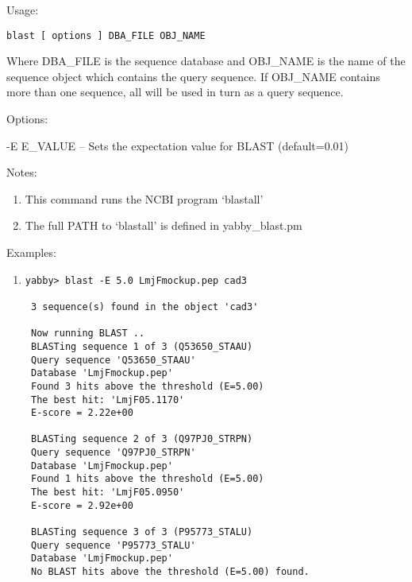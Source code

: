 \begin{description}


\item{Usage:}

{\tt blast [ options ] DBA\_FILE OBJ\_NAME}

 Where DBA\_FILE is the sequence database and OBJ\_NAME is the
 name of the sequence object which contains the query sequence.
 If OBJ\_NAME contains more than one sequence, all will be used
 in turn as a query sequence.


\item{Options:}
\begin{description}
\item -E E\_VALUE -- Sets the expectation value for BLAST (default=0.01)
\end{description}


\item{Notes:}
\begin{enumerate}
\item This command runs the NCBI program `blastall'
\item The full PATH to `blastall' is defined in yabby\_blast.pm
\end{enumerate}


\item{Examples:}
\begin{enumerate}

\item
\begin{verbatim}
yabby> blast -E 5.0 LmjFmockup.pep cad3

 3 sequence(s) found in the object 'cad3'

 Now running BLAST ..
 BLASTing sequence 1 of 3 (Q53650_STAAU)
 Query sequence 'Q53650_STAAU'
 Database 'LmjFmockup.pep'
 Found 3 hits above the threshold (E=5.00)
 The best hit: 'LmjF05.1170'
 E-score = 2.22e+00

 BLASTing sequence 2 of 3 (Q97PJ0_STRPN)
 Query sequence 'Q97PJ0_STRPN'
 Database 'LmjFmockup.pep'
 Found 1 hits above the threshold (E=5.00)
 The best hit: 'LmjF05.0950'
 E-score = 2.92e+00

 BLASTing sequence 3 of 3 (P95773_STALU)
 Query sequence 'P95773_STALU'
 Database 'LmjFmockup.pep'
 No BLAST hits above the threshold (E=5.00) found.

\end{verbatim}


\end{enumerate}
\end{description}
